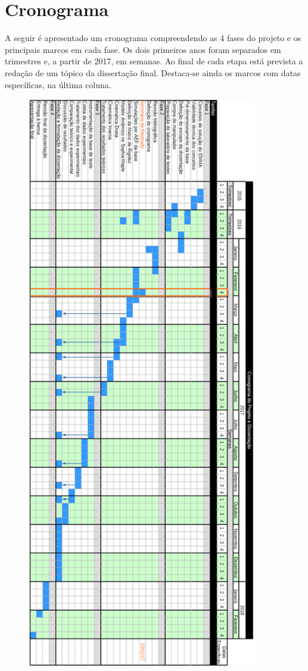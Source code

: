 \chapter{Cronograma}

A seguir é apresentado um cronograma compreendendo as 4 fases
do projeto e os principais marcos em cada fase. Os dois primeiros anos foram
separados em trimestres e, a partir de 2017, em semanas. Ao final de
cada etapa está prevista a redação de um tópico da dissertação final. Destaca-se
ainda os marcos com datas específicas, na última coluna.


\newpage


\begin{figure}
\centering
\includegraphics[width=10cm]{figs/cronograma.PNG}
\label{fig::cronograma}
\end{figure}
